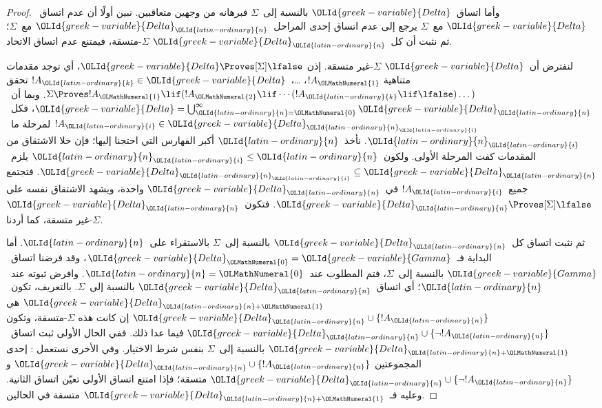 \documentclass[../../../include/open-logic-section]{subfiles}
\begin{document}
\begin{proof}
وأما اتساق~$\OLId{greek-variable}{Delta}$ بالنسبة إلى~$\Sigma$ فبرهانه من وجهين متعاقبين.
نبين أولًا أن عدم اتساق~$\OLId{greek-variable}{Delta}$ مع~$\Sigma$ يرجع إلى عدم اتساق
إحدى المراحل~$\OLId{greek-variable}{Delta}_\OLId{latin-ordinary}{n}$ مع~$\Sigma$؛ ثم نثبت أن كل~$\OLId{greek-variable}{Delta}_\OLId{latin-ordinary}{n}$
$\Sigma$-متسقة، فيمتنع عدم اتساق الاتحاد.

لنفترض أن~$\OLId{greek-variable}{Delta}$ $\Sigma$-غير متسقة.
إذن $\OLId{greek-variable}{Delta} \Proves[\Sigma] \lfalse$، أي توجد مقدمات متناهية
$!A_\OLMathNumeral{1}$، \dots،~$!A_\OLId{latin-ordinary}{k} \in \OLId{greek-variable}{Delta}$ تحقق
$\Sigma \Proves !A_\OLMathNumeral{1} \lif (!A_\OLMathNumeral{2} \lif \cdots (!A_\OLId{latin-ordinary}{k} \lif
\lfalse)\dots)$. وبما أن~$\OLId{greek-variable}{Delta} = \bigcup_{\OLId{latin-ordinary}{n}=\OLMathNumeral{0}}^\infty \OLId{greek-variable}{Delta}_\OLId{latin-ordinary}{n}$،
فكل~$!A_\OLId{latin-ordinary}{i} \in \OLId{greek-variable}{Delta}_{\OLId{latin-ordinary}{n}_\OLId{latin-ordinary}{i}}$ لمرحلة ما~$\OLId{latin-ordinary}{n}_\OLId{latin-ordinary}{i}$.
نأخذ~$\OLId{latin-ordinary}{n}$ أكبر الفهارس التي احتجنا إليها؛ فإن خلا الاشتقاق من المقدمات
كفت المرحلة الأولى. ولكون~$\OLId{latin-ordinary}{n}_\OLId{latin-ordinary}{i} \le \OLId{latin-ordinary}{n}$ يلزم~$\OLId{greek-variable}{Delta}_{\OLId{latin-ordinary}{n}_\OLId{latin-ordinary}{i}} \subseteq \OLId{greek-variable}{Delta}_\OLId{latin-ordinary}{n}$.
فتجتمع جميع~$!A_\OLId{latin-ordinary}{i}$ في~$\OLId{greek-variable}{Delta}_\OLId{latin-ordinary}{n}$ واحدة،
ويشهد الاشتقاق نفسه على $\OLId{greek-variable}{Delta}_\OLId{latin-ordinary}{n} \Proves[\Sigma] \lfalse$.
فتكون~$\OLId{greek-variable}{Delta}_\OLId{latin-ordinary}{n}$ $\Sigma$-غير متسقة، كما أردنا.

ثم نثبت اتساق كل~$\OLId{greek-variable}{Delta}_\OLId{latin-ordinary}{n}$ بالنسبة إلى~$\Sigma$ بالاستقراء على~$\OLId{latin-ordinary}{n}$.
أما البداية فـ~$\OLId{greek-variable}{Delta}_\OLMathNumeral{0} = \OLId{greek-variable}{Gamma}$، وقد فرضنا اتساق~$\OLId{greek-variable}{Gamma}$
بالنسبة إلى~$\Sigma$، فتم المطلوب عند~$\OLId{latin-ordinary}{n} = \OLMathNumeral{0}$.
وافرض ثبوته عند~$\OLId{latin-ordinary}{n}$؛ أي اتساق~$\OLId{greek-variable}{Delta}_\OLId{latin-ordinary}{n}$ بالنسبة إلى~$\Sigma$.
بالتعريف، تكون~$\OLId{greek-variable}{Delta}_{\OLId{latin-ordinary}{n}+\OLMathNumeral{1}}$ هي
$\OLId{greek-variable}{Delta}_\OLId{latin-ordinary}{n} \cup \{!A_\OLId{latin-ordinary}{n}\}$ إن كانت هذه $\Sigma$-متسقة،
وتكون $\OLId{greek-variable}{Delta}_\OLId{latin-ordinary}{n} \cup \{\lnot!A_\OLId{latin-ordinary}{n}\}$ فيما عدا ذلك.
ففي الحال الأولى ثبت اتساق~$\OLId{greek-variable}{Delta}_{\OLId{latin-ordinary}{n}+\OLMathNumeral{1}}$ بالنسبة إلى~$\Sigma$
بنفس شرط الاختيار. وفي الأخرى نستعمل
:
إحدى المجموعتين $\OLId{greek-variable}{Delta}_\OLId{latin-ordinary}{n} \cup \{!A_\OLId{latin-ordinary}{n}\}$ و$\OLId{greek-variable}{Delta}_\OLId{latin-ordinary}{n} \cup \{\lnot!A_\OLId{latin-ordinary}{n}\}$
متسقة؛ فإذا امتنع اتساق الأولى تعيّن اتساق الثانية.
وعليه فـ~$\OLId{greek-variable}{Delta}_{\OLId{latin-ordinary}{n}+\OLMathNumeral{1}}$ متسقة في الحالين.
\end{proof}
\end{document}
